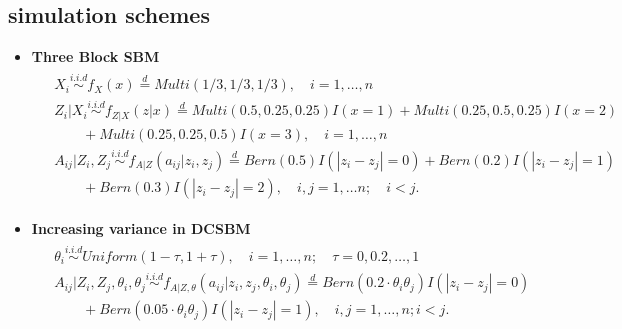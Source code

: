 \documentclass[12pt]{article}
\theoremstyle{definition}
\begin{document}
\subsection{simulation schemes}
\begin{itemize}	

	\item \textbf{Three Block SBM}
	\begin{equation}
	\label{eq:Three}
	\begin{gathered}
	\begin{aligned}
	&  X_{i} \overset{i.i.d}{\sim} f_{X}(x)   \stackrel{d}{=}  Multi(1/3, 1/3, 1/3), \quad i = 1, \ldots , n \\ 
	&  Z_{i} | X_{i}  \overset{i.i.d}{\sim}    f_{Z|X}(z|x)  \stackrel{d}{=}   Multi(0.5, 0.25, 0.25) I( x = 1 ) +   Multi(0.25, 0.5, 0.25) I (x = 2)  \qquad  \\ & \quad \quad + Multi(0.25, 0.25, 0.5)I(x = 3), \quad  i = 1,\ldots,n  \\
	&  A_{ij} | Z_{i}, Z_{j}   \overset{i.i.d}{\sim}   f_{A|Z}(a_{ij} | z_{i}, z_{j}) \stackrel{d}{=}  Bern(0.5) I ( |z_{i} - z_{j}| = 0 )  + Bern(0.2) I(|z_{i} - z_{j}| = 1) \\ & \quad \quad + Bern(0.3) I (|z_{i} - z_{j}| = 2),  \quad i,j=1, \ldots n ; \quad i < j.
	\end{aligned}
	\end{gathered}
	\end{equation}
	
\item \textbf{Increasing variance in DCSBM}
	\begin{equation}
	\label{eq:dcVariance}
	\begin{gathered}
	\begin{aligned}
	& \theta_{i} \overset{i.i.d}{\sim} Uniform(1 - \tau, 1 + \tau),\quad i = 1, \ldots, n; \quad \tau = 0, 0.2, \ldots, 1\\ 
	& A_{ij} | Z_{i}, Z_{j}, \theta_{i}, \theta_{j}   \overset{i.i.d}{\sim}   f_{A|Z, \theta}(a_{ij} | z_{i}, z_{j}, \theta_{i}, \theta_{j}) \stackrel{d}{=} Bern(0.2 \cdot \theta_{i}\theta_{j}) I ( |z_{i} - z_{j}| = 0 ) \\ & \quad \quad + Bern(0.05 \cdot \theta_{i} \theta_{j} ) I(|z_{i} - z_{j}| = 1), \quad i,j=1, \ldots, n; i < j. 
	\end{aligned}
	\end{gathered}
	\end{equation}


\end{itemize}
\end{document}
